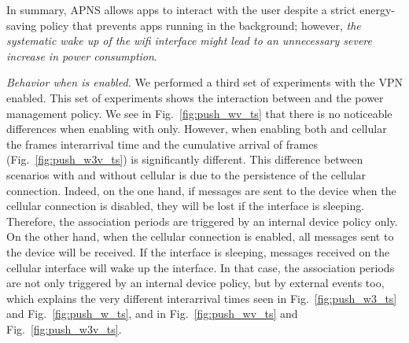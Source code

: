 In summary, APNS allows apps to interact with the user despite a strict energy-saving policy that 
prevents apps running in the background; however, \emph{the systematic wake up of
the wifi interface might lead to an unnecessary severe increase in power
consumption}. 







\noindent\emph{Behavior when \meddle is enabled.} We performed a third set of experiments with the VPN enabled. This set
of experiments shows the interaction between \meddle 
and the power management policy. We see in
Fig.~\ref{fig:push_wv_ts} that
there is no noticeable differences when enabling \meddle with \wifi{} only. However,
when enabling both \wifi and cellular the frames interarrival time
and the cumulative arrival of frames (Fig.~\ref{fig:push_w3v_ts}) is
significantly different. This difference between scenarios with and
without cellular is due to the persistence of the cellular connection. Indeed, on
the one hand, if messages are sent to the device when the cellular connection is disabled,
they will be lost if the \wifi interface is sleeping. Therefore, the
\wifi association periods are triggered by an internal device policy
only. On the other hand, when the cellular connection is enabled, all
messages sent to the device will be received. If the \wifi interface
is sleeping, messages received on the cellular interface will wake up the
\wifi interface. In that case, the \wifi association periods are not
only triggered by an internal device policy, but by external events
too, which explains the very different interarrival times seen in
Fig.~\ref{fig:push_w3_ts} and Fig.~\ref{fig:push_w_ts}, and in
Fig.~\ref{fig:push_wv_ts} and Fig.~\ref{fig:push_w3v_ts}.

